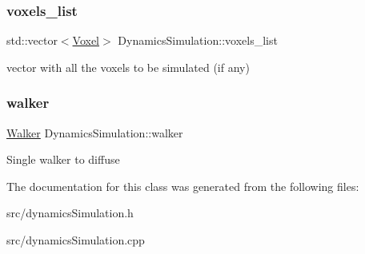 \subsubsection{\texorpdfstring{voxels\+\_\+list}{voxels\_list}}
{\footnotesize\ttfamily std\+::vector$<$\hyperlink{class_voxel}{Voxel}$>$ Dynamics\+Simulation\+::voxels\+\_\+list}

vector with all the voxels to be simulated (if any) \mbox{\label{class_dynamics_simulation_a9a5d2596527abdcdd185430c97dea9ad}} 
\subsubsection{\texorpdfstring{walker}{walker}}
{\footnotesize\ttfamily \hyperlink{class_walker}{Walker} Dynamics\+Simulation\+::walker}

Single walker to diffuse 

The documentation for this class was generated from the following files\+:\begin{DoxyCompactItemize}
\item 
src/dynamics\+Simulation.\+h\item 
src/dynamics\+Simulation.\+cpp\end{DoxyCompactItemize}

